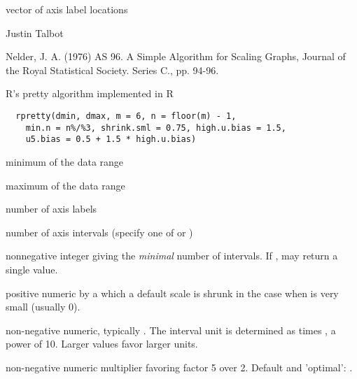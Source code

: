 \documentclass[letterpaper]{book}
\begin{document}
%
\begin{Value}
vector of axis label locations
\end{Value}
%
\begin{Author}\relax
Justin Talbot 
\end{Author}
%
\begin{References}\relax
Nelder, J. A. (1976) AS 96. A Simple Algorithm for
Scaling Graphs, Journal of the Royal Statistical Society.
Series C., pp. 94-96.
\end{References}
%
\begin{Description}\relax
R's pretty algorithm implemented in R
\end{Description}
%
\begin{Usage}
\begin{verbatim}
  rpretty(dmin, dmax, m = 6, n = floor(m) - 1,
    min.n = n%/%3, shrink.sml = 0.75, high.u.bias = 1.5,
    u5.bias = 0.5 + 1.5 * high.u.bias)
\end{verbatim}
\end{Usage}
%
\begin{Arguments}
\begin{ldescription}
\item[\code{dmin}] minimum of the data range

\item[\code{dmax}] maximum of the data range

\item[\code{m}] number of axis labels

\item[\code{n}] number of axis intervals (specify one of
 or )

\item[\code{min.n}] nonnegative integer giving the
\emph{minimal} number of intervals. If ,
 may return a single value.

\item[\code{shrink.sml}] positive numeric by a which a default
scale is shrunk in the case when  is very
small (usually 0).

\item[\code{high.u.bias}] non-negative numeric, typically
. The interval unit is determined as
 times , a power of 10. Larger
 values favor larger units.

\item[\code{u5.bias}] non-negative numeric multiplier favoring
factor 5 over 2. Default and 'optimal': .
\end{ldescription}
\end{Arguments}
\end{document}
